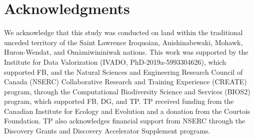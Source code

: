 \section{Acknowledgments}

We acknowledge that this study was conducted on land within the traditional
unceded territory of the Saint Lawrence Iroquoian, Anishinabewaki, Mohawk,
Huron-Wendat, and Omàmiwininiwak nations. This work was supported by the
Institute for Data Valorization (IVADO, PhD-2019a-5993304626), which supported
FB, and the Natural Sciences and Engineering Research Council of Canada (NSERC)
Collaborative Research and Training Experience (CREATE) program, through the
Computational Biodiversity Science and Services (BIOS2) program, which supported
FB, DG, and TP. TP received funding from the Canadian Institute for Ecology and
Evolution and a donation from the Courtois Foundation. TP also acknowledges
financial support from NSERC through the Discovery Grants and Discovery
Accelerator Supplement programs. 


\endinput
